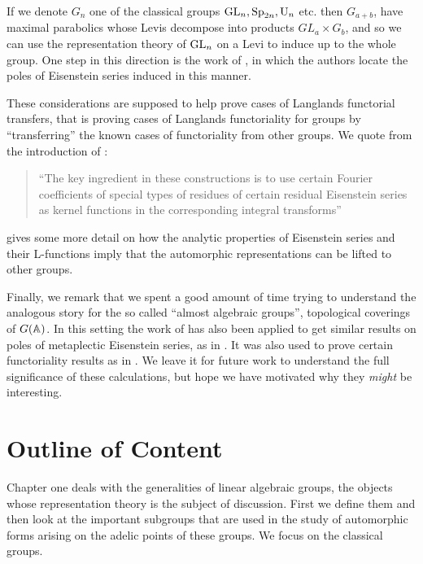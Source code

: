 If we denote \(G_n\) one of the classical groups \(\operatorname{GL}_n, \operatorname{Sp}_{2n}, \mathrm{U}_n\) etc. then \(G_{a+b}\), have maximal parabolics whose Levis decompose into products \(GL_a\times G_{b}\), and so we can use the representation theory of \(\operatorname{GL}_n\) on a Levi to induce up to the whole group. One step in this direction is the work of \cite{jiangPolesCertainResidual2013}, in which the authors locate the poles of Eisenstein series induced in this manner. 

These considerations are supposed to help prove cases of Langlands functorial transfers, that is proving cases of Langlands functoriality for groups by ``transferring'' the known cases of functoriality from other groups. We quote from the introduction of \cite{jiangPolesCertainResidual2013}:

\begin{quote}
	``The key ingredient in these constructions is to use certain Fourier coefficients of special types of residues of certain residual Eisenstein series as kernel functions in the corresponding integral transforms''
\end{quote}
\cite{bumpRankinSelbergMethodIntroduction2011} gives some more detail on how the analytic properties of Eisenstein series and their L-functions imply that the automorphic representations can be lifted to other groups. 

Finally, we remark that we spent a good amount of time trying to understand the analogous story for the so called ``almost algebraic groups'', topological coverings of \(G(\A)\). In this setting the work of \cite{jiangPolesCertainResidual2013} has also been applied to get similar results on poles of metaplectic Eisenstein series, as in \cite{kaplanDoublingConstructionsComplete2021}. It was also used to prove certain functoriality results as in \cite{caiDoublingConstructionsGlobal2024}. We leave it for future work to understand the full significance of these calculations, but hope we have motivated why they \textit{might} be interesting.

\section*{Outline of Content}
Chapter one deals with the generalities of linear algebraic groups, the objects whose representation theory is the subject of discussion. First we define them and then look at the important subgroups that are used in the study of automorphic forms arising on the adelic points of these groups. We focus on the classical groups.

